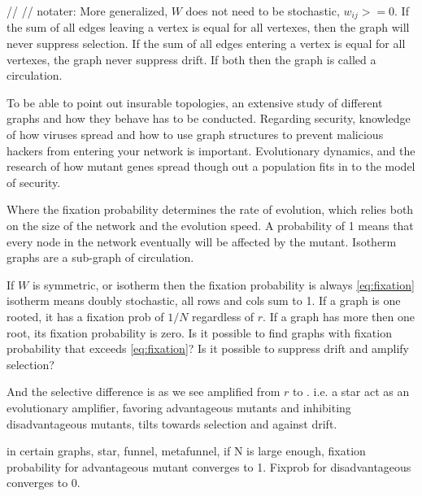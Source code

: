 //
//
 notater:
More generalized, $W$ does not need to be stochastic, $w_{ij}>=0$. 
If the sum of all edges leaving a vertex is equal for all vertexes, then the graph will never suppress selection.
If the sum of all edges entering a vertex is equal for all vertexes, the graph never suppress drift.
If both then the graph is called a circulation.
     
To be able to point out insurable topologies, an extensive study of different graphs and how they behave has to be conducted. Regarding security, knowledge of how viruses spread and how to use graph structures to prevent malicious hackers from entering your network is important. Evolutionary dynamics, and the research of how mutant genes spread though out a population fits in to the model of security. 

Where the fixation probability determines the rate of evolution, which relies both on the size of the network and the evolution speed. A probability of 1 means that every node in the network eventually will be affected by the mutant.   
Isotherm graphs are a sub-graph of circulation. 

If $W$ is symmetric, or isotherm then the fixation probability is always \ref{eq:fixation}
isotherm means doubly stochastic, all rows and cols sum to 1. 
If a graph is one rooted, it has a fixation prob of $1/N$ regardless of $r$. If a graph has more then one root, its fixation probability is zero. 
Is it possible to find graphs with fixation probability that exceeds \ref{eq:fixation}? Is it possible to suppress drift and amplify selection?

And the selective difference is as we see amplified from $r$ to . i.e. a star act as an evolutionary amplifier,
 favoring advantageous mutants and inhibiting disadvantageous mutants, tilts towards selection and against drift.
 
 
 in certain graphs, star, funnel, metafunnel, if N is large enough, fixation probability for advantageous mutant converges to 1. Fixprob for disadvantageous converges to 0.
